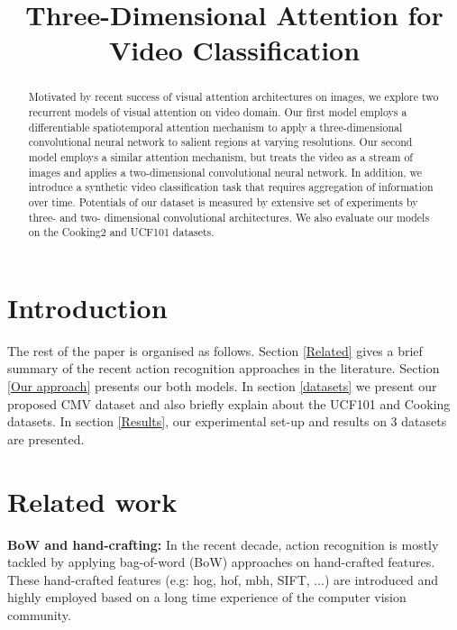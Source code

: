 \documentclass{article} %
\title{Three-Dimensional Attention for Video Classification}
\begin{document}
\maketitle

\begin{abstract}
Motivated by recent success of visual attention architectures on images, we explore two recurrent models of visual attention on video domain. Our first model employs a differentiable spatiotemporal attention mechanism to apply a three-dimensional convolutional neural network to salient regions at varying resolutions. Our second model employs a similar attention mechanism, but treats the video as a stream of images and applies a two-dimensional convolutional neural network. In addition, we introduce a synthetic video classification task that requires aggregation of information over time. Potentials of our dataset is measured by extensive set of experiments by three- and two- dimensional convolutional architectures. We also evaluate our models on the Cooking2 and UCF101 datasets.
\end{abstract}

\section{Introduction}
The rest of the paper is organised as follows.
Section \ref{Related} gives a brief summary of the recent action recognition approaches in the literature. 
Section \ref{Our approach} presents our both models. In section \ref{datasets} we present our proposed CMV dataset and also briefly explain about the UCF101 and Cooking datasets. In section \ref{Results}, our experimental set-up and results on 3 datasets are presented.
\section{Related work}
\textbf{BoW and hand-crafting:} In the recent decade, action recognition is mostly tackled by applying bag-of-word (BoW) approaches on hand-crafted features. These hand-crafted features (e.g: hog, hof, mbh, SIFT, ...) are introduced and highly employed based on a long time experience of the computer vision community. 
\end{document}
